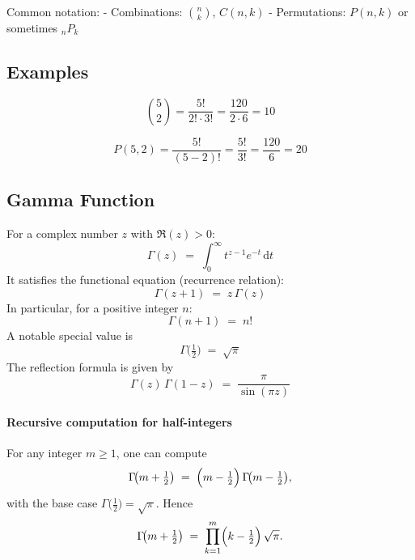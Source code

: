 \documentclass{article}
\begin{document}
\begin{multicols}{2}
Common notation:
- Combinations: \(\binom{n}{k}\), \(C(n,k)\)
- Permutations: \(P(n,k)\) or sometimes \(_nP_k\)

\subsection*{Examples}
\[
\binom{5}{2} = \frac{5!}{2! \cdot 3!} = \frac{120}{2 \cdot 6} = 10
\]

\[
P(5,2) = \frac{5!}{(5-2)!} = \frac{5!}{3!} = \frac{120}{6} = 20
\]

\subsection*{Gamma Function}
For a complex number \(z\) with \(\Re(z)>0\):
\[
\Gamma(z) \;=\; \int_{0}^{\infty} t^{z-1} e^{-t}\,\mathrm{d}t
\]
It satisfies the functional equation (recurrence relation):
\[
\Gamma(z+1) \;=\; z\,\Gamma(z)
\]
In particular, for a positive integer \(n\):
\[
\Gamma(n+1) \;=\; n!
\]
A notable special value is
\[
\Gamma\!\bigl(\tfrac12\bigr) \;=\; \sqrt{\pi}
\]
The reflection formula is given by
\[
\Gamma(z)\,\Gamma(1 - z) \;=\; \frac{\pi}{\sin(\pi z)}
\]
\paragraph{Recursive computation for half-integers}
For any integer \(m\ge1\), one can compute
\[
\Gamma\!\bigl(m+\tfrac12\bigr)
\;=\;\Bigl(m - \tfrac12\Bigr)\,\Gamma\!\bigl(m - \tfrac12\bigr),
\]
with the base case \(\Gamma\!\bigl(\tfrac12\bigr)=\sqrt{\pi}\).  
Hence
\[
\Gamma\!\bigl(m+\tfrac12\bigr)
\;=\;\prod_{k=1}^{m}\Bigl(k-\tfrac12\Bigr)\,\sqrt{\pi}.
\]

\end{multicols}
\end{document}
